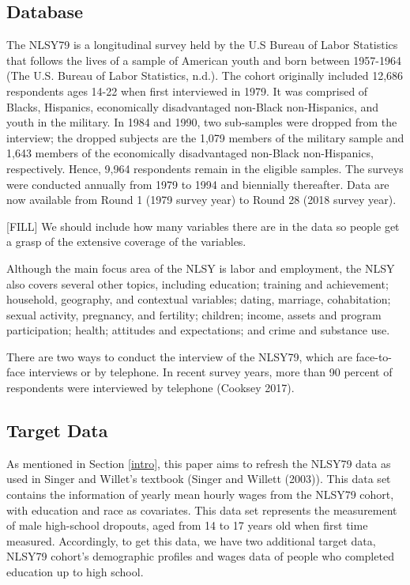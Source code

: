 \documentclass{article}
\begin{document}
\hypertarget{database-1}{%
\subsection{Database}\label{database-1}}

The NLSY79 is a longitudinal survey held by the U.S Bureau of Labor Statistics that follows the lives of a sample of American youth and born between 1957-1964 (The U.S. Bureau of Labor Statistics, n.d.). The cohort originally included 12,686 respondents ages 14-22 when first interviewed in 1979. It was comprised of Blacks, Hispanics, economically disadvantaged non-Black non-Hispanics, and youth in the military. In 1984 and 1990, two sub-samples were dropped from the interview; the dropped subjects are the 1,079 members of the military sample and 1,643 members of the economically disadvantaged non-Black non-Hispanics, respectively. Hence, 9,964 respondents remain in the eligible samples. The surveys were conducted annually from 1979 to 1994 and biennially thereafter. Data are now available from Round 1 (1979 survey year) to Round 28 (2018 survey year).

{[}FILL{]} We should include how many variables there are in the data so people get a grasp of the extensive coverage of the variables.

Although the main focus area of the NLSY is labor and employment, the NLSY also covers several other topics, including education; training and achievement; household, geography, and contextual variables; dating, marriage, cohabitation; sexual activity, pregnancy, and fertility; children; income, assets and program participation; health; attitudes and expectations; and crime and substance use.

There are two ways to conduct the interview of the NLSY79, which are face-to-face interviews or by telephone. In recent survey years, more than 90 percent of respondents were interviewed by telephone (Cooksey 2017).

\hypertarget{target-data}{%
\subsection{Target Data}\label{target-data}}

As mentioned in Section \ref{intro}, this paper aims to refresh the NLSY79 data as used in Singer and Willet's textbook (Singer and Willett (2003)). This data set contains the information of yearly mean hourly wages from the NLSY79 cohort, with education and race as covariates. This data set represents the measurement of male high-school dropouts, aged from 14 to 17 years old when first time measured. Accordingly, to get this data, we have two additional target data, NLSY79 cohort's demographic profiles and wages data of people who completed education up to high school.
\end{document}
